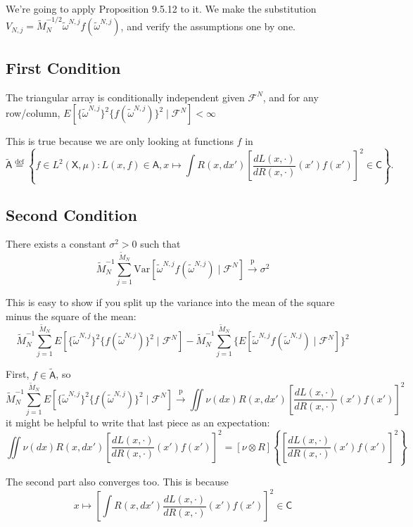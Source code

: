 \documentclass{article}
\begin{document}
We're going to apply Proposition 9.5.12 to it. We make the substitution $V_{N,j} = \tilde{M}_N^{-1/2} \tilde{\omega}^{N,j} f(\tilde{\omega}^{N,j})$, and verify the assumptions one by one. 
\newline

\subsection{First Condition}


The triangular array is conditionally independent given $\mathcal{F}^N$, and for any row/column, $E[ \{\tilde{\omega}^{N,j}\}^2 \{f(\tilde{\omega}^{N,j})\}^2 \mid \mathcal{F}^N] < \infty$

This is true because we are only looking at functions $f$ in 
$$
\tilde{\mathsf{A}} \overset{\text{def}}{=} \left\{ f \in L^2(\mathsf{X}, \mu) : L(x,f) \in \mathsf{A}, x \mapsto \int R(x,dx')\left[ \frac{dL(x,\cdot)}{dR(x,\cdot)}(x') f(x') \right]^2 \in \mathsf{C} \right\}.
$$



\subsection{Second Condition}

There exists a constant $\sigma^2 >0$ such that
$$
\tilde{M}_N^{-1}\sum_{j=1}^{\tilde{M}_N} \text{Var}\left[  \tilde{\omega}^{N,j} f(\tilde{\omega}^{N,j})  \mid \mathcal{F}^N \right] \overset{\text{p}}{\to} \sigma^2
$$

This is easy to show if you split up the variance into the mean of the square minus the square of the mean:
$$
\tilde{M}_N^{-1}\sum_{j=1}^{\tilde{M}_N} E\left[  \{\tilde{\omega}^{N,j}\}^2 \{f(\tilde{\omega}^{N,j})\}^2  \mid \mathcal{F}^N \right] - \tilde{M}_N^{-1}\sum_{j=1}^{\tilde{M}_N} \{E\left[  \tilde{\omega}^{N,j} f(\tilde{\omega}^{N,j})  \mid \mathcal{F}^N \right]\}^2
$$

First, $f \in \tilde{\mathsf{A}}$, so 
$$
\tilde{M}_N^{-1}\sum_{j=1}^{\tilde{M}_N} E\left[  \{\tilde{\omega}^{N,j}\}^2 \{f(\tilde{\omega}^{N,j})\}^2  \mid \mathcal{F}^N \right] \overset{\text{p}}{\to}
\iint \nu(dx) R(x,dx')\left[ \frac{dL(x,\cdot)}{dR(x,\cdot)}(x') f(x') \right]^2
$$
it might be helpful to write that last piece as an expectation:
$$
\iint \nu(dx) R(x,dx')\left[ \frac{dL(x,\cdot)}{dR(x,\cdot)}(x') f(x') \right]^2
=
[\nu \otimes R]\left\{ \left[ \frac{dL(x,\cdot)}{dR(x,\cdot)}(x') f(x') \right]^2 \right\}
$$

The second part also converges too. This is because 
$$
x \mapsto \left[ \int R(x,dx') \frac{dL(x,\cdot)}{dR(x,\cdot)}(x') f(x') \right]^2 \in \mathsf{C}
$$
\end{document}
